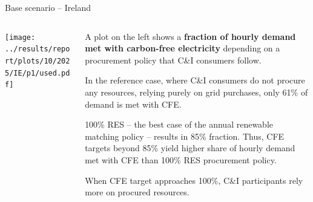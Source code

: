 \begin{frame}{Base scenario -- Ireland}

{\footnotesize
\vspace{0.3cm}

\begin{columns}[T]
\begin{column}{9cm}
\centering

\texttt{[image: ../results/report/plots/10/2025/IE/p1/used.pdf]}
\end{column}
\begin{column}{6cm}

\vspace{0.1cm}
A plot on the left shows a {\bf fraction of hourly demand met with carbon-free
electricity} depending on a procurement policy that C\&I consumers follow.

\vspace{0.3cm}
In the reference case, where C\&I consumers do not procure any resources,  
relying purely on grid purchases, \alert{only 61\%} of demand is met with CFE.

\vspace{0.3cm}
100\% RES -- the best case of the annual renewable matching policy -- 
results in 85\% fraction. Thus, \alert{CFE targets beyond 85\%} yield 
higher share of hourly demand met with CFE
than 100\% RES procurement policy.

\vspace{0.3cm}
When CFE target approaches 100\%, C\&I participants 
\alert{rely more on procured resources}.

\end{column}
\end{columns}
}
\end{frame}



